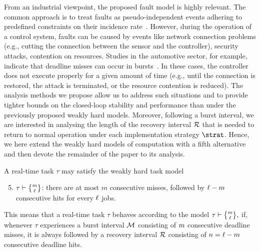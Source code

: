 From an industrial viewpoint, the proposed fault model is highly relevant.
The common approach is to treat faults as pseudo-independent events adhering to predefined constraints on their incidence rate~\cite{reliabook,montgomery2009introduction, Teich:2017}.
However, during the operation of a control system, faults can be caused by events like network connection problems (e.g., cutting the connection between the sensor and the controller), security attacks, contention on resources.
Studies in the automotive sector, for example, indicate that deadline misses can occur in bursts~\cite{Quinton:2014,Xu:2015}.
In these cases, the controller does not execute properly for a given amount of time (e.g., until the connection is restored, the attack is terminated, or the resource contention is reduced).
The analysis methods we propose allow us to address such situations and to provide tighter bounds on the closed-loop stability and performance than under the previously proposed weakly hard models.
Moreover, following a burst interval, we are interested in analysing the length of the recovery interval $\mathcal{R}$ that is needed to return to normal operation under each implementation strategy $\strat$.
Hence, we here extend the weakly hard models of computation with a fifth alternative and then devote the remainder of the paper to its analysis.
 
\begin{definition}%
    \label{def:task-model}%
    A real-time task $\tau$ may satisfy the weakly hard task model
    \begin{enumerate}[label=(\roman*)]
        \setcounter{enumi}{4}
        \item $\tau \vdash \genfrac{\{}{\}}{0pt}{}{\nummisses}{\numtotalanalysed}$: there are at most $m$ consecutive misses, followed by $\ell-m$ consecutive hits for every $\ell$ jobs.
    \end{enumerate}
    This means that a real-time task $\tau$ behaves according to the model
    $
        \tau \vdash
        \genfrac{\{}{\}}{0pt}{}{\nummisses}{\numtotalanalysed},
    $
    if, whenever $\tau$ experiences a burst interval $\mathcal{M}$ consisting of $m$ consecutive deadline misses, it is always followed by a recovery interval $\mathcal{R}$ consisting of $n=\ell-m$ consecutive deadline hits.
\end{definition}

